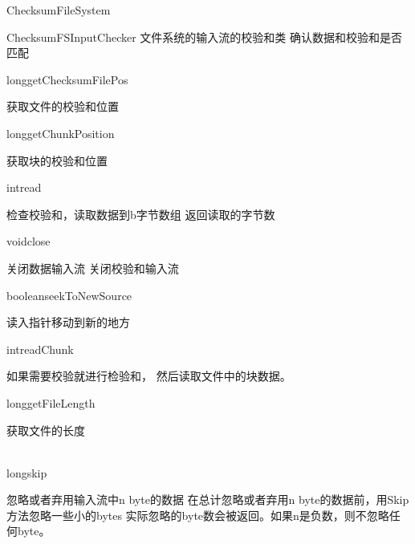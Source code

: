 \begin{XeClass}{ChecksumFileSystem}
\begin{XeInnerClass}{ChecksumFSInputChecker}
 文件系统的输入流的校验和类
 确认数据和校验和是否匹配

        \begin{XeMethod}{\XePrivate}{long}{getChecksumFilePos}
             
 获取文件的校验和位置

        \end{XeMethod}

        \begin{XeMethod}{\XeProtected}{long}{getChunkPosition}
             
 获取块的校验和位置

        \end{XeMethod}

        \begin{XeMethod}{\XePublic}{int}{read}
             
 检查校验和，读取数据到b字节数组
 返回读取的字节数

        \end{XeMethod}

        \begin{XeMethod}{\XePublic}{void}{close}
             
 关闭数据输入流
 关闭校验和输入流

        \end{XeMethod}

        \begin{XeMethod}{\XePublic}{boolean}{seekToNewSource}
             
 读入指针移动到新的地方

        \end{XeMethod}

        \begin{XeMethod}{\XeProtected}{int}{readChunk}
             
 如果需要校验就进行检验和，
 然后读取文件中的块数据。

        \end{XeMethod}

        \begin{XeMethod}{\XePrivate}{long}{getFileLength}
             
 获取文件的长度

        \end{XeMethod}

        \begin{XeMethod}{\XePublic \\ \XeSync}{long}{skip}
             
 忽略或者弃用输入流中n byte的数据
 在总计忽略或者弃用n byte的数据前，用Skip方法忽略一些小的bytes
 实际忽略的byte数会被返回。如果n是负数，则不忽略任何byte。


\end{XeMethod}
\end{XeInnerClass}
\end{XeClass}
